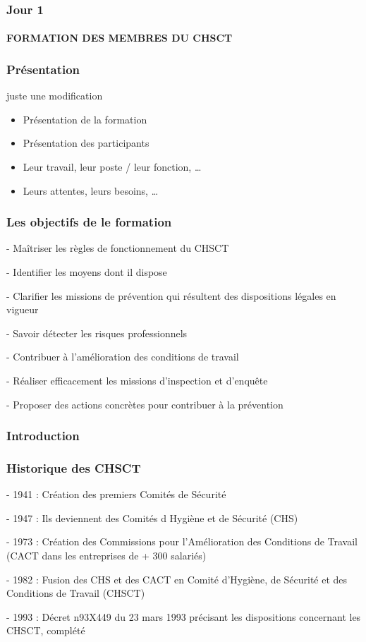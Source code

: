 \documentclass{beamer}
\begin{document}

\begin{frame}
\frametitle{Jour 1}
\framesubtitle{FORMATION DES MEMBRES DU CHSCT}
\end{frame}


\begin{frame}
\frametitle{Présentation}
juste une modification
	\begin{itemize}
		\item Présentation de la formation
		\item Présentation des participants
        \item Leur travail, leur poste / leur fonction, …
        \item Leurs attentes, leurs besoins, …
	\end{itemize}
\end{frame}


\begin{frame}
\frametitle{Les objectifs de le formation}


- Maîtriser les règles de fonctionnement du CHSCT

- Identifier les moyens dont il dispose

- Clarifier les missions de prévention qui résultent des dispositions légales en vigueur

- Savoir détecter les risques professionnels

- Contribuer à l’amélioration des conditions de travail

- Réaliser efficacement les missions d’inspection et d’enquête

- Proposer des actions concrètes pour contribuer à la prévention

\end{frame}  


\begin{frame}
\frametitle{Introduction}
\end{frame} 


\begin{frame}
\frametitle{Historique des CHSCT}
- 1941 : Création des premiers Comités de Sécurité 

- 1947 : Ils deviennent des Comités d Hygiène et de Sécurité (CHS)

- 1973 : Création des Commissions pour l'Amélioration des Conditions  de Travail (CACT dans les entreprises de + 300 salariés)

- 1982 : Fusion des CHS et des CACT en Comité d'Hygiène, de Sécurité et des Conditions de Travail (CHSCT) 

- 1993 : Décret n93X449 du 23 mars 1993 précisant les dispositions concernant les CHSCT, complété
\end{frame} 
\end{document}
